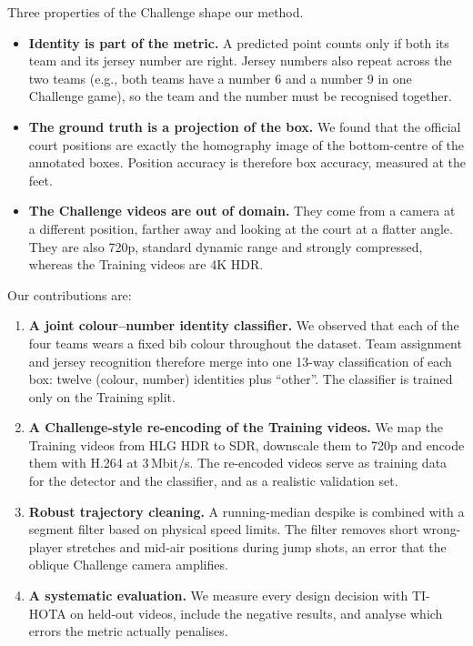 \documentclass[11pt,a4paper]{article}
\begin{document}
Three properties of the Challenge shape our method.
\begin{itemize}
\item \textbf{Identity is part of the metric.} A predicted point counts only if both its team and its
jersey number are right. Jersey numbers also repeat across the two teams (e.g., both teams have a
number 6 and a number 9 in one Challenge game), so the team and the number must be recognised together.
\item \textbf{The ground truth is a projection of the box.} We found that the official court positions
are exactly the homography image of the bottom-centre of the annotated boxes. Position accuracy is
therefore box accuracy, measured at the feet.
\item \textbf{The Challenge videos are out of domain.} They come from a camera at a different position,
farther away and looking at the court at a flatter angle. They are also 720p, standard dynamic range and strongly compressed, whereas the Training videos
are 4K HDR.
\end{itemize}

Our contributions are:
\begin{enumerate}
\item \textbf{A joint colour--number identity classifier.} We observed that each of the four teams
wears a fixed bib colour throughout the dataset. Team assignment and jersey recognition therefore merge
into one 13-way classification of each box: twelve (colour, number) identities plus ``other''. The
classifier is trained only on the Training split.
\item \textbf{A Challenge-style re-encoding of the Training videos.} We map the Training videos from
HLG HDR to SDR, downscale them to 720p and encode them with H.264 at 3\,Mbit/s. The re-encoded videos
serve as training data for the detector and the classifier, and as a realistic validation set.
\item \textbf{Robust trajectory cleaning.} A running-median despike is combined with a segment filter
based on physical speed limits. The filter removes short wrong-player stretches and mid-air positions
during jump shots, an error that the oblique Challenge camera amplifies.
\item \textbf{A systematic evaluation.} We measure every design decision with TI-HOTA on held-out
videos, include the negative results, and analyse which errors the metric actually penalises.
\end{enumerate}
\end{document}
